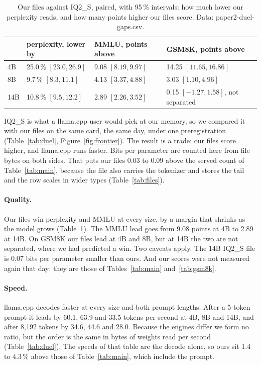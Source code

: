 \begin{table}[t]
\centering\small\setlength{\tabcolsep}{6pt}
\caption{Our files against IQ2\_S, paired, with 95\,\% intervals: how much
lower our perplexity reads, and how many points higher our files score. Data:
paper2-duel-gaps.csv.}
\label{tab:duelgaps}
\begin{tabular}{llll}
\toprule
 & perplexity, lower by & MMLU, points above & GSM8K, points above\\
\midrule
4B & 25.0\,\% $[23.0, 26.9]$ & 9.08 $[8.19, 9.97]$ & 14.25 $[11.65, 16.86]$\\
8B & 9.7\,\% $[8.3, 11.1]$ & 4.13 $[3.37, 4.88]$ & 3.03 $[1.10, 4.96]$\\
14B & 10.8\,\% $[9.5, 12.2]$ & 2.89 $[2.26, 3.52]$ & 0.15 $[-1.27, 1.58]$, not separated\\
\bottomrule
\end{tabular}
\end{table}

IQ2\_S is what a llama.cpp user would pick at our memory, so we compared it
with our files on the same card, the same day, under one preregistration
(Table~\ref{tab:duel}, Figure~\ref{fig:frontier}). The result is a trade: our
files score higher, and llama.cpp runs faster. Bits per parameter are counted
here from file bytes on both sides. That puts our files 0.03 to 0.09 above
the served count of Table~\ref{tab:main}, because the file also carries the
tokenizer and stores the tail and the row scales in wider types
(Table~\ref{tab:files}).

\paragraph{Quality.} Our files win perplexity and MMLU at every size, by a
margin that shrinks as the model grows (Table~\ref{tab:duelgaps}). The MMLU
lead goes from 9.08 points at 4B to 2.89 at 14B. On GSM8K our files lead at 4B
and 8B, but at 14B the two are not separated, where we had predicted a win.
Two caveats apply. The 14B IQ2\_S file is 0.07 bits per parameter smaller than
ours. And our scores were not measured again that day: they are those of
Tables~\ref{tab:main} and~\ref{tab:gsm8k}.

\paragraph{Speed.} llama.cpp decodes faster at every size and both prompt
lengths. After a 5-token prompt it leads by 60.1, 63.9 and 33.5 tokens per
second at 4B, 8B and 14B, and after 8{,}192 tokens by 34.6, 44.6 and 28.0.
Because the engines differ we form no ratio, but the order is the same in
bytes of weights read per second (Table~\ref{tab:duel}). The speeds of that
table are the decode alone, so ours sit 1.4 to 4.3\,\% above those of
Table~\ref{tab:main}, which include the prompt.

